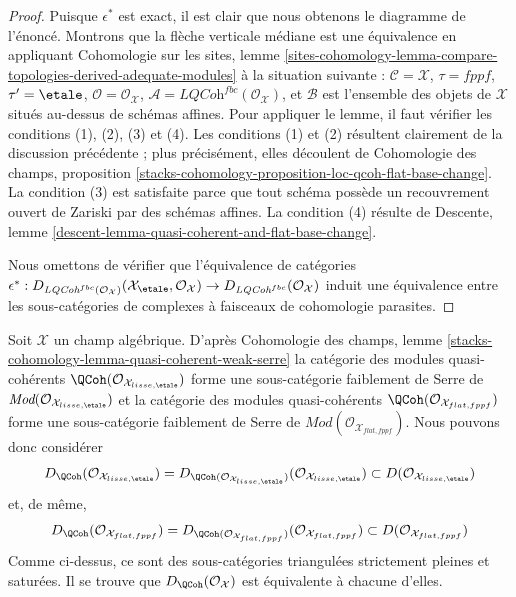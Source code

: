 \begin{proof}
Puisque $\epsilon^*$ est exact, il est clair que nous obtenons le diagramme de
l'énoncé. Montrons que la flèche verticale médiane est une équivalence en
appliquant Cohomologie sur les sites, lemme
\ref{sites-cohomology-lemma-compare-topologies-derived-adequate-modules}
à la situation suivante :
$\mathcal{C} = \mathcal{X}$,
$\tau = fppf$,
$\tau' = \etale$,
$\mathcal{O} = \mathcal{O}_\mathcal{X}$,
$\mathcal{A} = \textit{LQCoh}^{fbc}(\mathcal{O}_\mathcal{X})$, et
$\mathcal{B}$ est l'ensemble des objets de $\mathcal{X}$ situés au-dessus de
schémas affines. Pour appliquer le lemme, il faut vérifier les conditions (1),
(2), (3) et (4). Les conditions (1) et (2) résultent clairement de la
discussion précédente ; plus précisément, elles découlent de Cohomologie des
champs, proposition
\ref{stacks-cohomology-proposition-loc-qcoh-flat-base-change}. La condition
(3) est satisfaite parce que tout schéma possède un recouvrement ouvert de
Zariski par des schémas affines. La condition (4) résulte de Descente, lemme
\ref{descent-lemma-quasi-coherent-and-flat-base-change}.

\medskip\noindent
Nous omettons de vérifier que l'équivalence de catégories $\epsilon^* :
D_{\textit{LQCoh}^{fbc}(\mathcal{O}_\mathcal{X})}(
\mathcal{X}_\etale, \mathcal{O}_\mathcal{X})
\to
D_{\textit{LQCoh}^{fbc}}(\mathcal{O}_\mathcal{X})$
induit une équivalence entre les sous-catégories de complexes à faisceaux de
cohomologie parasites.
\end{proof}

\noindent
Soit $\mathcal{X}$ un champ algébrique. D'après Cohomologie des champs, lemme
\ref{stacks-cohomology-lemma-quasi-coherent-weak-serre}
la catégorie des modules quasi-cohérents
$\QCoh(\mathcal{O}_{\mathcal{X}_{lisse,\etale}})$
forme une sous-catégorie faiblement de Serre de
$\textit{Mod}(\mathcal{O}_{\mathcal{X}_{lisse,\etale}})$
et la catégorie des modules quasi-cohérents
$\QCoh(\mathcal{O}_{\mathcal{X}_{flat,fppf}})$
forme une sous-catégorie faiblement de Serre de
$\textit{Mod}(\mathcal{O}_{\mathcal{X}_{flat,fppf}})$.
Nous pouvons donc considérer
$$
D_\QCoh(\mathcal{O}_{\mathcal{X}_{lisse,\etale}}) =
D_{\QCoh(\mathcal{O}_{\mathcal{X}_{lisse,\etale}})}(
\mathcal{O}_{\mathcal{X}_{lisse,\etale}})
\subset
D(\mathcal{O}_{\mathcal{X}_{lisse,\etale}})
$$
et, de même,
$$
D_\QCoh(\mathcal{O}_{\mathcal{X}_{flat,fppf}}) =
D_{\QCoh(\mathcal{O}_{\mathcal{X}_{flat,fppf}})}(
\mathcal{O}_{\mathcal{X}_{flat,fppf}})
\subset
D(\mathcal{O}_{\mathcal{X}_{flat,fppf}})
$$
Comme ci-dessus, ce sont des sous-catégories triangulées strictement pleines et
saturées. Il se trouve que $D_\QCoh(\mathcal{O}_\mathcal{X})$ est équivalente à
chacune d'elles.

